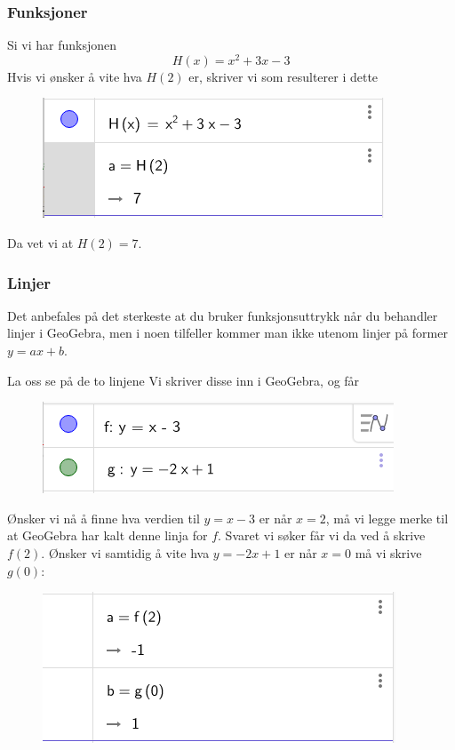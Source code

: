 \subsubsection{Funksjoner}
Si vi har funksjonen
\[H(x)= x^2 + 3x -3 \]
Hvis vi ønsker å vite hva $ H(2) $ er, skriver vi
som resulterer i dette
\begin{figure}[H]
	\centering
	\includegraphics[scale=0.5]{H}
\end{figure}
Da vet vi at $ H(2)=7 $.
\subsubsection{Linjer}
Det anbefales på det sterkeste at du bruker funksjonsuttrykk når du behandler linjer i GeoGebra, men i noen tilfeller kommer man ikke utenom linjer på former $ y=ax+b $. \vsk

La oss se på de to linjene \vs
{}
Vi skriver disse inn i GeoGebra, og får
\begin{figure}[H]
	\centering
	\includegraphics[scale=0.5]{fglin1}
\end{figure}
Ønsker vi nå å finne hva verdien til $ {y=x-3} $ er når $ {x=2} $, må vi legge merke til at GeoGebra har kalt denne linja for $ f $. Svaret vi søker får vi da ved å skrive $ f(2) $. Ønsker vi samtidig å vite hva $ {y=-2x+1} $ er når $ {x=0} $ må vi skrive $ g(0) $:
\begin{figure}[H]
	\centering
	\includegraphics[scale=0.6]{fglin2}
\end{figure}


